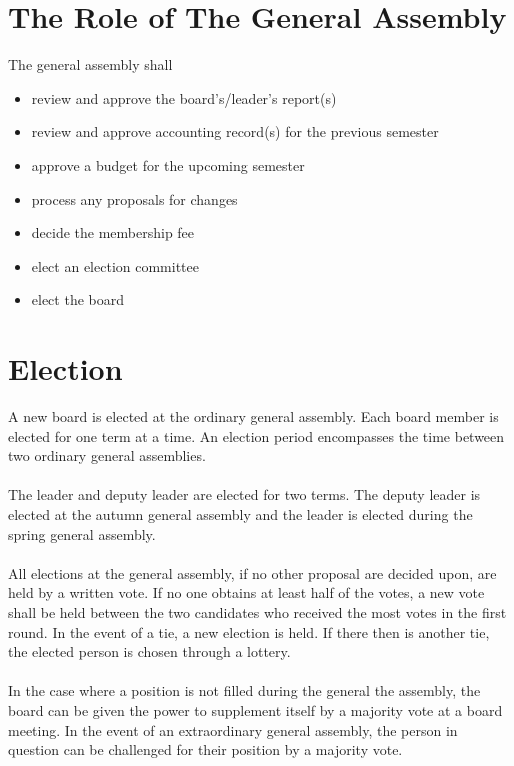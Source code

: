 \documentclass[12pt,a4paper,norsk]{article}
\begin{document}
\section{The Role of The General Assembly}

The general assembly shall

\begin{itemize}
    \item review and approve the board's/leader's report(s)
    \item review and approve accounting record(s) for the previous semester
    \item approve a budget for the upcoming semester
    \item process any proposals for changes
    \item decide the membership fee
    \item elect an election committee
    \item elect the board
\end{itemize}



\section{Election}

A new board is elected at the ordinary general assembly. Each board member is elected for one term at a time.
An election period encompasses the time between two ordinary general assemblies.
\\
\\
The leader and deputy leader are elected for two terms. The deputy leader is elected at the autumn general assembly and the leader is elected during the spring general assembly.
\\
\\
All elections at the general assembly, if no other proposal are decided upon, are held by a written vote. If no one obtains at least half of the votes, a new vote shall be held between the two candidates who received the most votes in the first round. In the event of a tie, a new election is held. If there then is another tie, the elected person is chosen through a lottery.
\\
\\
In the case where a position is not filled during the general the assembly, the board can be given the power to supplement itself by a  majority vote at a board meeting. In the event of an extraordinary general assembly, the person in question can be challenged for their position by a  majority vote.
\end{document}
